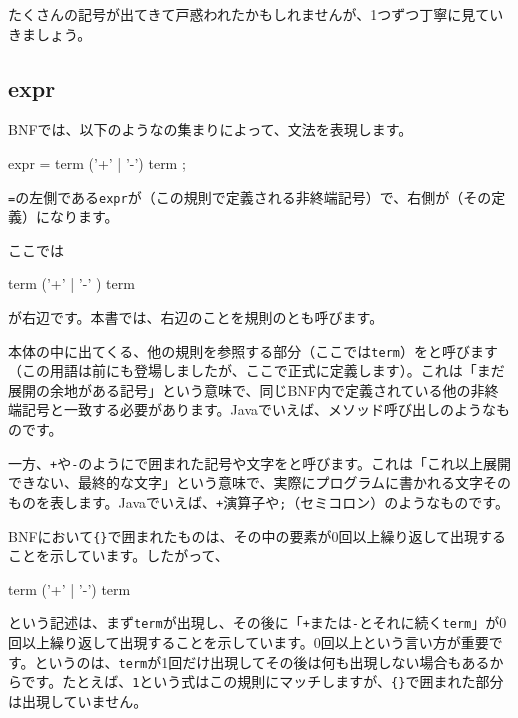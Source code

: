 たくさんの記号が出てきて戸惑われたかもしれませんが、1つずつ丁寧に見ていきましょう。

\subsection{expr}

BNFでは、以下のようなの集まりによって、文法を表現します。

\begin{codescreen}{}
expr = term { ('+' | '-') term };
\end{codescreen}

\texttt{=}の左側である\texttt{expr}が（この規則で定義される非終端記号）で、右側が（その定義）になります。

ここでは

\begin{codescreen}{}
term { ('+' | '-' ) term }
\end{codescreen}

\noindent が右辺です。本書では、右辺のことを規則のとも呼びます。

本体の中に出てくる、他の規則を参照する部分（ここでは\texttt{term}）をと呼びます（この用語は前にも登場しましたが、ここで正式に定義します）。これは「まだ展開の余地がある記号」という意味で、同じBNF内で定義されている他の非終端記号と一致する必要があります。Javaでいえば、メソッド呼び出しのようなものです。

一方、\texttt{\textquotesingle{}+\textquotesingle{}}や\texttt{\textquotesingle{}-\textquotesingle{}}のように\texttt{\textquotesingle{}}で囲まれた記号や文字をと呼びます。これは「これ以上展開できない、最終的な文字」という意味で、実際にプログラムに書かれる文字そのものを表します。Javaでいえば、\texttt{+}演算子や\texttt{;}（セミコロン）のようなものです。

BNFにおいて\texttt{\{\}}で囲まれたものは、その中の要素が0回以上繰り返して出現することを示しています。したがって、

\begin{codescreen}{}
term { ('+' | '-') term }
\end{codescreen}

という記述は、まず\texttt{term}が出現し、その後に「\texttt{+}または\texttt{-}とそれに続く\texttt{term}」が0回以上繰り返して出現することを示しています。0回以上という言い方が重要です。というのは、\texttt{term}が1回だけ出現してその後は何も出現しない場合もあるからです。たとえば、\texttt{1}という式はこの規則にマッチしますが、\texttt{\{\}}で囲まれた部分は出現していません。

